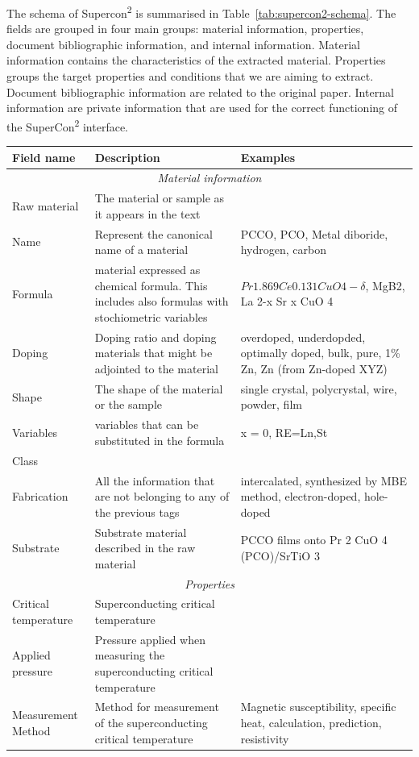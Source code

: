 \documentclass{article}
\begin{document}
The schema of Supercon\textsuperscript{2} is summarised in Table~\ref{tab:supercon2-schema}. The fields are grouped in four main groups: material information, properties, document bibliographic information, and internal information.
Material information contains the characteristics of the extracted material. 
Properties groups the target properties and conditions that we are aiming to extract. 
Document bibliographic information are related to the original paper. 
Internal information are private information that are used for the correct functioning of the SuperCon\textsuperscript{2} interface. 



\begin{table}[ht]
\centering\small
\begin{tabularx}{\linewidth}{p{}XX}
\toprule 
\textbf{Field name} & \textbf{Description} & \textbf{Examples} \\ 
\midrule

\multicolumn{3}{c}{\emph{Material information}} \\
Raw material & The material or sample as it appears in the text &\\
Name  & Represent the canonical name of a material & PCCO, PCO, Metal diboride, hydrogen, carbon \\
Formula & material expressed as chemical formula. This includes also formulas with stochiometric variables & $Pr1.869Ce0.131CuO 4-\delta$, MgB2, La 2-x Sr x CuO 4 \\
Doping  & Doping ratio and doping materials that might be adjointed to the material & overdoped, underdopded, optimally doped, bulk, pure, 1\% Zn, Zn (from Zn-doped XYZ)\\
Shape  & The shape of the material or the sample & single crystal, polycrystal, wire, powder, film \\
Variables  & variables that can be substituted in the formula & x = 0, RE=Ln,St\\
Class  &&\\
Fabrication  & All the information that are not belonging to any of the previous tags &  intercalated, synthesized by MBE method, electron-doped, hole-doped \\
Substrate  & Substrate material described in the raw material & PCCO films onto Pr 2 CuO 4 (PCO)/SrTiO 3 \\

\multicolumn{3}{c}{\emph{Properties}} \\
Critical temperature  & Superconducting critical temperature &\\
Applied pressure  & Pressure applied when measuring the superconducting critical temperature&\\
Measurement Method  & Method for measurement of the superconducting critical temperature& Magnetic susceptibility, specific heat, calculation, prediction, resistivity\\


\end{tabularx}
\end{table}
\end{document}
